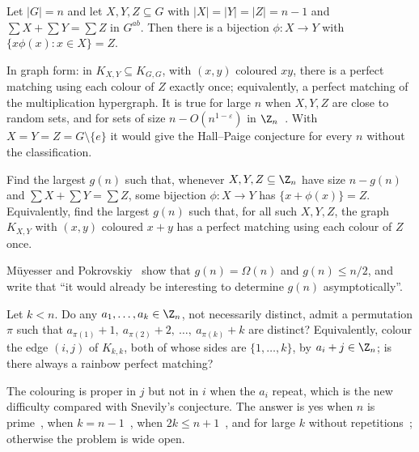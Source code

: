 \begin{conjecture}\label{conj:mp-hp}
Let $|G|=n$ and let $X,Y,Z\subseteq G$ with $|X|=|Y|=|Z|=n-1$ and $\sum X+\sum Y=\sum Z$ in $G^{ab}$. Then there is a bijection $\phi\colon X\to Y$ with $\{x\phi(x):x\in X\}=Z$.
\end{conjecture}

In graph form: in $K_{X,Y}\subseteq K_{G,G}$, with $(x,y)$ coloured $xy$, there is a perfect matching using each colour of $Z$ exactly once; equivalently, a perfect matching of the multiplication hypergraph. It is true for large $n$ when $X,Y,Z$ are close to random sets, and for sets of size $n-O(n^{1-\varepsilon})$ in $\Z_n$~\cite{mp25a}. With $X=Y=Z=G\setminus\{e\}$ it would give the Hall--Paige conjecture for every $n$ without the classification.

\begin{problem}\label{prob:g}
Find the largest $g(n)$ such that, whenever $X,Y,Z\subseteq\Z_n$ have size $n-g(n)$ and $\sum X+\sum Y=\sum Z$, some bijection $\phi\colon X\to Y$ has $\{x+\phi(x)\}=Z$. Equivalently, find the largest $g(n)$ such that, for all such $X,Y,Z$, the graph $K_{X,Y}$ with $(x,y)$ coloured $x+y$ has a perfect matching using each colour of $Z$ once.
\end{problem}

M\"uyesser and Pokrovskiy~\cite[\S7]{mp25a} show that $g(n)=\Omega(n)$ and $g(n)\leq n/2$, and write that ``it would already be interesting to determine $g(n)$ asymptotically''.

\begin{problem}\label{prob:ks}
Let $k<n$. Do any $a_1,\dots,a_k\in\Z_n$, not necessarily distinct, admit a permutation $\pi$ such that $a_{\pi(1)}+1,\ a_{\pi(2)}+2,\ \dots,\ a_{\pi(k)}+k$ are distinct? Equivalently, colour the edge $(i,j)$ of $K_{k,k}$, both of whose sides are $\{1,\dots,k\}$, by $a_i+j\in\Z_n$; is there always a rainbow perfect matching?
\end{problem}

The colouring is proper in $j$ but not in $i$ when the $a_i$ repeat, which is the new difficulty compared with Snevily's conjecture. The answer is yes when $n$ is prime~\cite{alon00}, when $k=n-1$~\cite{hall52}, when $2k\leq n+1$~\cite{ks02}, and for large $k$ without repetitions~\cite{mp25a}; otherwise the problem is wide open.


